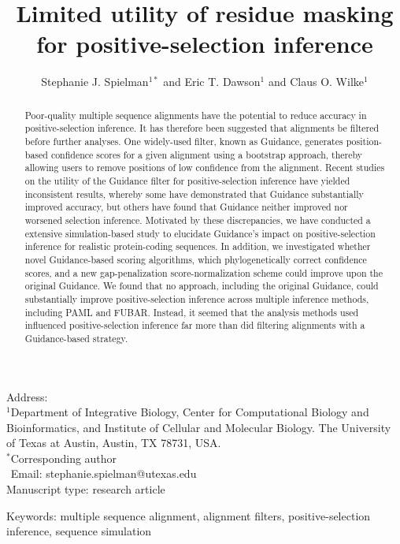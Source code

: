 \documentclass[10pt]{article}
\begin{document}
\title{\textbf{Limited utility of residue masking for positive-selection inference}}
\author{Stephanie J. Spielman$^{1*}$ and Eric T. Dawson$^{1}$ and Claus O. Wilke$^{1}$}
\date{}

\maketitle
\noindent
Address:\\
$^1$Department of Integrative Biology, Center for Computational Biology and Bioinformatics, and Institute of Cellular and Molecular Biology.
The University of Texas at Austin, Austin, TX 78731, USA.\\

\bigskip
\noindent
$^*$Corresponding author\\
$\phantom{^*}$Email: stephanie.spielman@utexas.edu\\

\bigskip
\noindent
Manuscript type: research article

\bigskip
\noindent Keywords: multiple sequence alignment, alignment filters, positive-selection inference, sequence simulation

\newpage
\begin{abstract}
Poor-quality multiple sequence alignments have the potential to reduce accuracy in positive-selection inference. It has therefore been suggested that alignments be filtered before further analyses. One widely-used filter, known as Guidance, generates position-based confidence scores for a given alignment using a bootstrap approach, thereby allowing users to remove positions of low confidence from the alignment. Recent studies on the utility of the Guidance filter for positive-selection inference have yielded inconsistent results, whereby some have demonstrated that Guidance substantially improved accuracy, but others have found that Guidance neither improved nor worsened selection inference. Motivated by these discrepancies, we have conducted a extensive simulation-based study to elucidate Guidance's impact on positive-selection inference for realistic protein-coding sequences. In addition, we investigated whether novel Guidance-based scoring algorithms, which phylogenetically correct confidence scores, and a new gap-penalization score-normalization scheme could improve upon the original Guidance. We found that no approach, including the original Guidance, could substantially improve positive-selection inference across multiple inference methods, including PAML and FUBAR. Instead, it seemed that the analysis methods used influenced positive-selection inference far more than did filtering alignments with a Guidance-based strategy.
\end{abstract}
\end{document}
